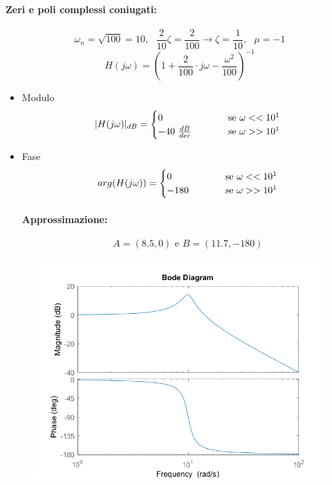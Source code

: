 \documentclass[a4paper]{article}
\begin{document}
	\paragraph{Zeri e poli complessi coniugati:}
	\[ \omega_n=\sqrt{100}=10, \text{ } \frac{2}{10}\zeta=\frac{2}{100} \longrightarrow \zeta=\frac{1}{10}, \text{ } \mu=-1 \]
	\[ H(j\omega) = \left( 1 + \frac{2}{100} \cdot j\omega - \frac{\omega^2}{100} \right)^{-1} \]
	\begin{itemize}
		\item Modulo
			\[
			|H(j\omega)|_{dB} =
				\begin{cases}
				0& \hspace{1.0cm} \text{se } \omega << 10^1 \\
				-40 \text{ } \frac{dB}{dec}& \hspace{1.0cm} \text{se } \omega >> 10^1
				\end{cases}
			\]
		\item Fase
			\[
			arg(H(j\omega)) =
				\begin{cases}
				0& \hspace{1.0cm} \text{se } \omega << 10^1 \\
				-180& \hspace{1.0cm} \text{se } \omega >> 10^1
				\end{cases}
			\]
			\paragraph{Approssimazione:}
			\[
			A = \left( 8.5, 0 \right) \text{ e } B = \left( 11.7, -180 \right)
			\]
	\end{itemize}
	\begin{figure}[h]
		\centering
		\includegraphics[scale=0.5]{complessi}
		\label{fig:complessi}
	\end{figure}
	\newpage
	
\end{document}
